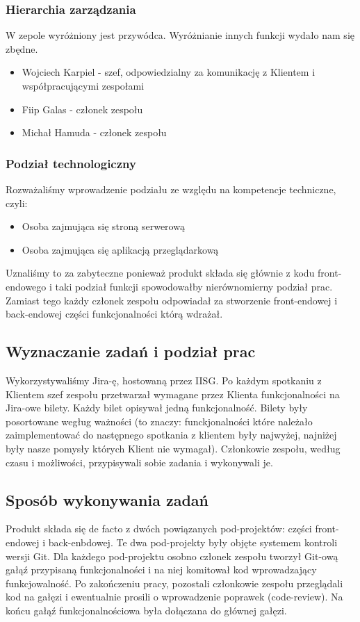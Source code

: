 \documentclass[polish,12pt]{aghthesis}
\begin{document}
\subsubsection{Hierarchia zarządzania}
W zepole wyróżniony jest przywódca. Wyróżnianie innych funkcji wydało nam się zbędne.
\begin{itemize}
    \item Wojciech Karpiel - szef, odpowiedzialny za komunikację z Klientem i współpracującymi zespołami
    \item Fiip Galas - członek zespołu
    \item Michał Hamuda - członek zespołu
\end{itemize}
\subsubsection{Podział technologiczny}
Rozważaliśmy wprowadzenie podziału ze względu na kompetencje techniczne, czyli:
\begin{itemize}
    \item Osoba zajmująca się stroną serwerową
    \item Osoba zajmująca się aplikacją przeglądarkową
\end{itemize}
Uznaliśmy to za zabyteczne ponieważ produkt składa się głównie z kodu front-endowego i taki podział funkcji spowodowałby nierównomierny podział prac. Zamiast tego każdy członek zespołu odpowiadał za stworzenie front-endowej i back-endowej części funkcjonalności którą wdrażał.

\subsection{Wyznaczanie zadań i podział prac}
Wykorzystywaliśmy Jira-ę, hostowaną przez IISG. Po każdym spotkaniu z Klientem szef zespołu przetwarzał wymagane przez Klienta funkcjonalności na Jira-owe bilety. Każdy bilet opisywał jedną funkcjonalność. Bilety były posortowane wegług ważności (to znaczy: funckjonalności które należało zaimplementować do następnego spotkania z klientem były najwyżej, najniżej były nasze pomysły których Klient nie wymagał). Członkowie zespołu, według czasu i możliwości, przypisywali sobie zadania i wykonywali je.

\subsection{Sposób wykonywania zadań}
Produkt składa się de facto z dwóch powiązanych pod-projektów: części front-endowej i back-enbdowej. Te dwa pod-projekty były objęte systemem kontroli wersji Git. Dla każdego pod-projektu osobno członek zespołu tworzył Git-ową gałąź przypisaną funkcjonalności i na niej komitował kod wprowadzający funkcjowalność. Po zakończeniu pracy, pozostali członkowie zespołu przeglądali kod na gałęzi i ewentualnie prosili o wprowadzenie poprawek (code-review). Na końcu gałąź funkcjonalnościowa była dołączana do głównej gałęzi.
\end{document}
